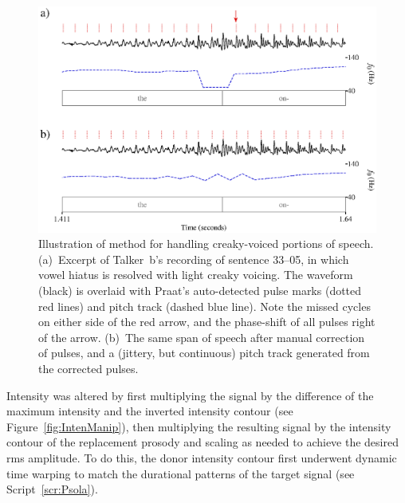 \begin{figure}
	\begin{centering}
	\includegraphics{figures/creakJitterShimmer/creakJitterShimmer.eps}
	\caption[Handling of creaky voicing in resynthesis]{Illustration of method for handling creaky-voiced portions of speech.  (a)~Excerpt of Talker~\ac{b}’s recording of sentence 33–05, in which vowel hiatus is resolved with light creaky voicing.  The waveform (black) is overlaid with Praat’s auto-detected pulse marks (dotted red lines) and pitch track (dashed blue line).  Note the missed cycles on either side of the red arrow, and the phase-shift of all pulses right of the arrow.  (b)~The same span of speech after manual correction of pulses, and a (jittery, but continuous) pitch track generated from the corrected pulses.\label{fig:JitShim}}
	\end{centering}
\end{figure}

Intensity was altered by first multiplying the signal by the difference of the maximum intensity and the inverted intensity contour (see Figure~\ref{fig:IntenManip}), then multiplying the resulting signal by the intensity contour of the replacement prosody and scaling as needed to achieve the desired \ac{rms} amplitude.  To do this, the donor intensity contour first underwent dynamic time warping to match the durational patterns of the target signal (see Script~\ref{scr:Psola}).


